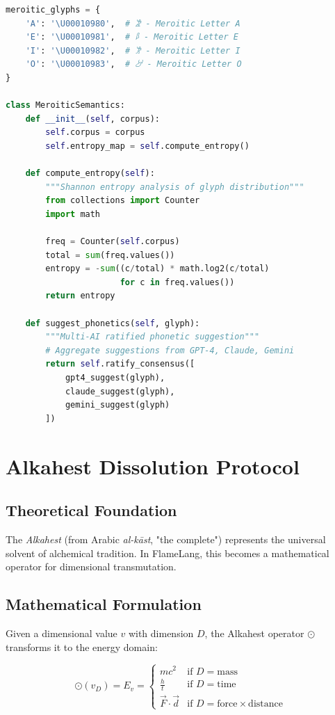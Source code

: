 \documentclass[11pt,a4paper]{article}
\begin{document}
\begin{lstlisting}[language=Python, caption=Meroitic Glyph Encoding]
meroitic_glyphs = {
    'A': '\U00010980',  # 𐦀 - Meroitic Letter A
    'E': '\U00010981',  # 𐦁 - Meroitic Letter E
    'I': '\U00010982',  # 𐦂 - Meroitic Letter I
    'O': '\U00010983',  # 𐦃 - Meroitic Letter O
}

class MeroiticSemantics:
    def __init__(self, corpus):
        self.corpus = corpus
        self.entropy_map = self.compute_entropy()
    
    def compute_entropy(self):
        """Shannon entropy analysis of glyph distribution"""
        from collections import Counter
        import math
        
        freq = Counter(self.corpus)
        total = sum(freq.values())
        entropy = -sum((c/total) * math.log2(c/total) 
                       for c in freq.values())
        return entropy
    
    def suggest_phonetics(self, glyph):
        """Multi-AI ratified phonetic suggestion"""
        # Aggregate suggestions from GPT-4, Claude, Gemini
        return self.ratify_consensus([
            gpt4_suggest(glyph),
            claude_suggest(glyph),
            gemini_suggest(glyph)
        ])
\end{lstlisting}

\section{Alkahest Dissolution Protocol}

\subsection{Theoretical Foundation}

The \textit{Alkahest} (from Arabic \textit{al-kāst}, "the complete") represents the universal solvent of alchemical tradition. In FlameLang, this becomes a mathematical operator for dimensional transmutation.

\subsection{Mathematical Formulation}

Given a dimensional value $v$ with dimension $D$, the Alkahest operator $\odot$ transforms it to the energy domain:

\begin{equation}
\odot(v_D) = E_v = \begin{cases}
m c^2 & \text{if } D = \text{mass} \\
\frac{h}{t} & \text{if } D = \text{time} \\
\vec{F} \cdot \vec{d} & \text{if } D = \text{force} \times \text{distance}
\end{cases}
\end{equation}
\end{document}
